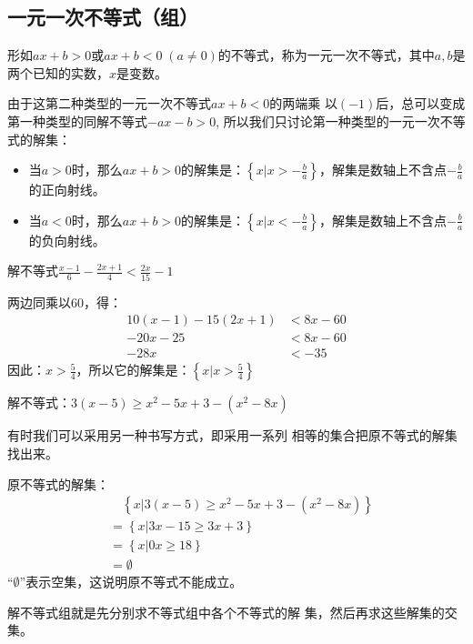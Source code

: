 \subsection{一元一次不等式（组）}
形如$ax+b>0$或$ax+b<0\; (a\ne 0)$的不等式，称为一元一次不等式，其中$a,b$是两个已知的实数，$x$是变数。

由于这第二种类型的一元一次不等式$ax+b<0$的两端乘
以$(-1)$后，总可以变成第一种类型的同解不等式$-ax-b>
0$, 所以我们只讨论第一种类型的一元一次不等式的解集：

\begin{itemize}
    \item 当$a>0$时，那么$ax+b>0$的解集是：$\left\{x\Big|x>-\frac{b}{a}\right\}$，解集是数轴上不含点$-\frac{b}{a}$
的正向射线。
\item 当$a<0$时，那么$ax+b>0$的解集是：$\left\{x\Big|x<-\frac{b}{a}\right\}$，解集是数轴上不含点$-\frac{b}{a}$
的负向射线。
\end{itemize}

\begin{example}
    解不等式$\frac{x-1}{6}-\frac{2x+1}{4}<\frac{2x}{15}-1$
\end{example}

\begin{solution}
两边同乘以60，得：
\[\begin{split}
    10(x-1)-15(2x+1)&<8x-60\\
    -20x-25&<8x-60\\
    -28x&<-35
\end{split}
\]
因此：$x>\frac{5}{4}$，所以它的解集是：$\left\{x\Big|x>\frac{5}{4}\right\}$
\end{solution}

\begin{example}
    解不等式：$3(x-5)\ge x^2-5x+3-(x^2-8x)$
\end{example}

\begin{solution}
    有时我们可以采用另一种书写方式，即采用一系列
相等的集合把原不等式的解集找出来。

原不等式的解集：
\[\begin{split}
&\quad    \left\{x|3(x-5)\ge x^2-5x+3-(x^2-8x)\right\}\\
&=\left\{x|3x-15\ge 3x+3\right\}\\
&=\left\{x|0x\ge 18\right\}\\
&=\emptyset
\end{split}\]
“$\emptyset$”表示空集，这说明原不等式不能成立。

解不等式组就是先分别求不等式组中各个不等式的解
集，然后再求这些解集的交集。
\end{solution}

